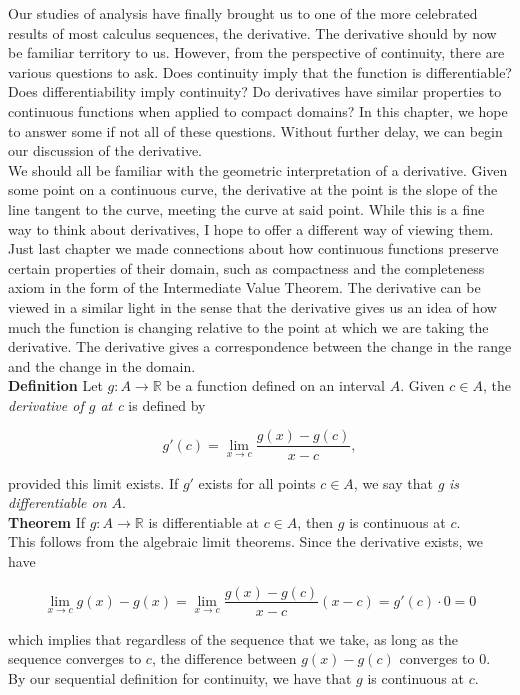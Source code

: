 \documentclass[12pt, letterpaper, twoside]{article}
\begin{document}
Our studies of analysis have finally brought us to one of the more celebrated results of most calculus sequences, the derivative. The derivative should by now be familiar territory to us. However, from the perspective of continuity, there are various questions to ask. Does continuity imply that the function is differentiable? Does differentiability imply continuity? Do derivatives have similar properties to continuous functions when applied to compact domains? In this chapter, we hope to answer some if not all of these questions. Without further delay, we can begin our discussion of the derivative. \\

We should all be familiar with the geometric interpretation of a derivative. Given some point on a continuous curve, the derivative at the point is the slope of the line tangent to the curve, meeting the curve at said point. While this is a fine way to think about derivatives, I hope to offer a different way of viewing them. Just last chapter we made connections about how continuous functions preserve certain properties of their domain, such as compactness and the completeness axiom in the form of the Intermediate Value Theorem. The derivative can be viewed in a similar light in the sense that the derivative gives us an idea of how much the function is changing relative to the point at which we are taking the derivative. The derivative gives a correspondence between the change in the range and the change in the domain. \\

\textbf{Definition} Let $g: A \to \mathbb{R}$ be a function defined on an interval $A$. Given $c \in A$, the \textit{derivative of $g$ at c} is defined by 

$$
g '(c) = \lim_{x \to c} \frac{g(x) - g(c)}{x - c} , 
$$

provided this limit exists. If $g'$ exists for all points $c \in A$, we say that \textit{g is differentiable on $A$}. \\

\textbf{Theorem} If $g: A \to \mathbb{R}$ is differentiable at $c \in A$, then $g$ is continuous at $c$. \\

This follows from the algebraic limit theorems. Since the derivative exists, we have

$$
\lim_{x \to c} g(x) - g(x) = \lim_{x \to c} \frac{g(x) - g(c)}{x - c} (x-c) = g'(c) \cdot 0 = 0
$$

which implies that regardless of the sequence that we take, as long as the sequence converges to $c$, the difference between $g(x) - g(c)$ converges to 0. By our sequential definition for continuity, we have that $g$ is continuous at $c$. \\
\end{document}
